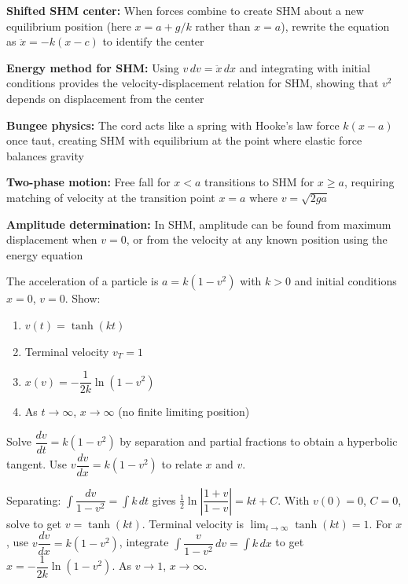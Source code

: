 \begin{takeaways}
\item \textbf{Shifted SHM center:} When forces combine to create SHM about a new equilibrium position (here $x = a + g/k$ rather than $x = a$), rewrite the equation as $\ddot{x} = -k(x - c)$ to identify the center
\item \textbf{Energy method for SHM:} Using $v\,dv = \ddot{x}\,dx$ and integrating with initial conditions provides the velocity-displacement relation for SHM, showing that $v^2$ depends on displacement from the center
\item \textbf{Bungee physics:} The cord acts like a spring with Hooke's law force $k(x-a)$ once taut, creating SHM with equilibrium at the point where elastic force balances gravity
\item \textbf{Two-phase motion:} Free fall for $x < a$ transitions to SHM for $x \ge a$, requiring matching of velocity at the transition point $x = a$ where $v = \sqrt{2ga}$
\item \textbf{Amplitude determination:} In SHM, amplitude can be found from maximum displacement when $v = 0$, or from the velocity at any known position using the energy equation
\end{takeaways}

\begin{problem}
The acceleration of a particle is $a=k(1-v^2)$ with $k>0$ and initial conditions $x=0$, $v=0$. Show:
\begin{enumerate}[label=\textbf{\alph*.}]
    \item $v(t)=\tanh(kt)$
    \item Terminal velocity $v_T=1$
    \item $x(v)=-\dfrac{1}{2k}\ln(1-v^2)$
    \item As $t\to\infty$, $x\to\infty$ (no finite limiting position)
\end{enumerate}
\end{problem}

\begin{hint}
Solve $\dfrac{dv}{dt}=k(1-v^2)$ by separation and partial fractions to obtain a hyperbolic tangent. Use $v\dfrac{dv}{dx}=k(1-v^2)$ to relate $x$ and $v$.
\end{hint}

\begin{solution}
Separating: $\int\dfrac{dv}{1-v^2}=\int k\,dt$ gives $\tfrac{1}{2}\ln\left|\dfrac{1+v}{1-v}\right|=kt+C$. With $v(0)=0$, $C=0$, solve to get $v=\tanh(kt)$. Terminal velocity is $\lim_{t\to\infty}\tanh(kt)=1$. For $x$, use $v\dfrac{dv}{dx}=k(1-v^2)$, integrate $\int\dfrac{v}{1-v^2}\,dv=\int k\,dx$ to get $x=-\dfrac{1}{2k}\ln(1-v^2)$. As $v\to1$, $x\to\infty$.
\end{solution}


